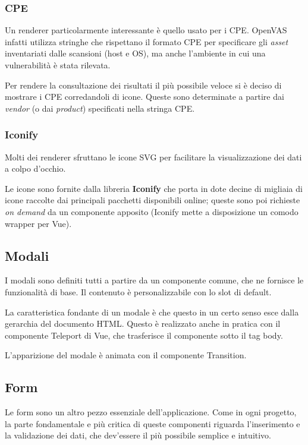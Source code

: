 \subsubsection{CPE}
Un renderer particolarmente interessante è quello usato per i CPE. OpenVAS infatti utilizza stringhe che rispettano il formato CPE per specificare gli \emph{asset} inventariati dalle scansioni (host e OS), ma anche l'ambiente in cui una vulnerabilità è stata rilevata.

Per rendere la consultazione dei risultati il più possibile veloce si è deciso di mostrare i CPE corredandoli di icone. Queste sono determinate a partire dai \emph{vendor} (o dai \emph{product}) specificati nella stringa CPE.

\subsubsection{Iconify}
Molti dei renderer sfruttano le icone SVG per facilitare la visualizzazione dei dati a colpo d'occhio.

Le icone sono fornite dalla libreria \textbf{Iconify} che porta in dote decine di migliaia di icone raccolte dai principali pacchetti disponibili online; queste sono poi richieste \emph{on demand} da un componente apposito (Iconify mette a disposizione un comodo wrapper per Vue).

\subsection{Modali}
I modali sono definiti tutti a partire da un componente comune, che ne fornisce le funzionalità di base. Il contenuto è personalizzabile con lo slot di default.

La caratteristica fondante di un modale è che questo in un certo senso esce dalla gerarchia del documento HTML. Questo è realizzato anche in pratica con il componente Teleport di Vue, che trasferisce il componente sotto il tag body.

L'apparizione del modale è animata con il componente Transition.

\subsection{Form}
Le form sono un altro pezzo essenziale dell'applicazione. Come in ogni progetto, la parte fondamentale e più critica di queste componenti riguarda l'inserimento e la validazione dei dati, che dev'essere il più possibile semplice e intuitivo.

